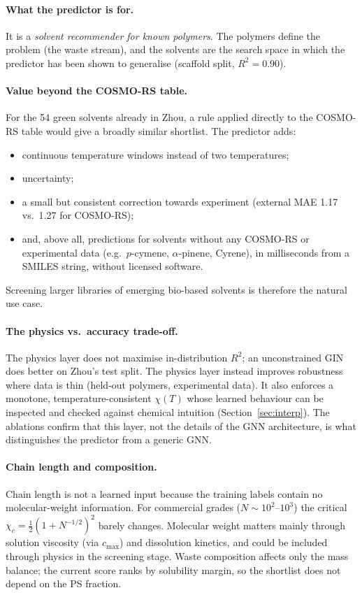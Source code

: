 \documentclass[11pt,a4paper]{article}
\begin{document}
\paragraph{What the predictor is for.} It is a \emph{solvent recommender for known polymers}. The
polymers define the problem (the waste stream), and the solvents are the search space in which the
predictor has been shown to generalise (scaffold split, $R^2=0.90$).

\paragraph{Value beyond the COSMO-RS table.} For the 54 green solvents already in Zhou, a rule applied
directly to the COSMO-RS table would give a broadly similar shortlist. The predictor adds:
\begin{itemize}
\item continuous temperature windows instead of two temperatures;
\item uncertainty;
\item a small but consistent correction towards experiment (external MAE 1.17 vs.\ 1.27 for COSMO-RS);
\item and, above all, predictions for solvents without any COSMO-RS or experimental data (e.g.\
$p$-cymene, $\alpha$-pinene, Cyrene), in milliseconds from a SMILES string, without licensed software.
\end{itemize}
Screening larger libraries of emerging bio-based solvents is therefore the natural use case.

\paragraph{The physics vs.\ accuracy trade-off.} The physics layer does not maximise in-distribution
$R^2$; an unconstrained GIN does better on Zhou's test split. The physics layer instead improves
robustness where data is thin (held-out polymers, experimental data). It also enforces a monotone,
temperature-consistent $\chi(T)$ whose learned behaviour can be inspected and checked against chemical
intuition (Section~\ref{sec:interp}). The ablations confirm that this layer, not the details of the GNN
architecture, is what distinguishes the predictor from a generic GNN.

\paragraph{Chain length and composition.} Chain length is not a learned input because the training labels
contain no molecular-weight information. For commercial grades ($N\sim10^2$--$10^3$) the critical
$\chi_c=\tfrac12(1+N^{-1/2})^2$ barely changes. Molecular weight matters mainly through solution
viscosity (via $c_{\max}$) and dissolution kinetics, and could be included through physics in the
screening stage. Waste composition affects only the mass balance; the current score ranks by solubility
margin, so the shortlist does not depend on the PS fraction.
\end{document}
